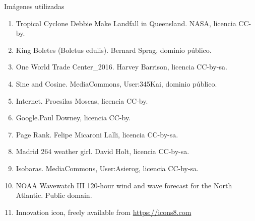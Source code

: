 \documentclass[
  unknownkeysallowed %
]{beamer}
\begin{document}
\begin{frame}{Imágenes utilizadas}
  \scriptsize
  \begin{enumerate}
  \item Tropical Cyclone Debbie Make Landfall in Queensland. NASA, licencia CC-by.
  \item King Boletes (Boletus edulis). Bernard Sprag, dominio público.
  \item One World Trade Center\_2016. Harvey Barrison, licencia CC-by-sa.
  \item Sine and Cosine. MediaCommons, User:345Kai, dominio público.
  \item Internet. Procsilas Moscas, licencia CC-by.
  \item Google.Paul Downey, licencia CC-by.
  \item Page Rank. Felipe Micaroni Lalli, licencia CC-by-sa.
  \item Madrid 264 weather girl. David Holt, licencia CC-by-sa.
  \item Isobaras. MediaCommons, User:Asierog, licencia CC-by-sa.
  \item NOAA Wavewatch III 120-hour wind and wave forecast for the
    North Atlantic. Public domain.
  \item Innovation icon, freely available from \url{https://icons8.com}
  \end{enumerate}
\end{frame}
\end{document}
